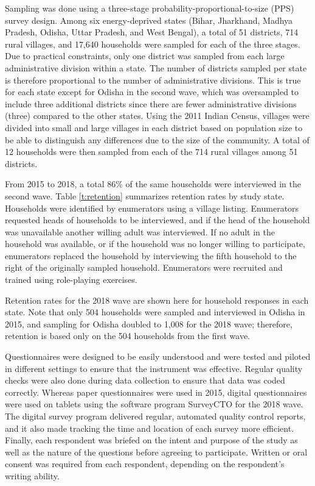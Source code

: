 \documentclass[11pt]{article}
\begin{document}
Sampling was done using a three-stage probability-proportional-to-size (PPS) survey design. Among six energy-deprived states (Bihar, Jharkhand, Madhya Pradesh, Odisha, Uttar Pradesh, and West Bengal), a total of 51 districts, 714 rural villages, and 17,640 households were sampled for each of the three stages. Due to practical constraints, only one district was sampled from each large administrative division within a state. The number of districts sampled per state is therefore proportional to the number of administrative divisions. This is true for each state except for Odisha in the second wave, which was oversampled to include three additional districts since there are fewer administrative divisions (three) compared to the other states. Using the 2011 Indian Census, villages were divided into small and large villages in each district based on population size to be able to distinguish any differences due to the size of the community. A total of 12 households were then sampled from each of the 714 rural villages among 51 districts. 

From 2015 to 2018, a total 86\% of the same households were interviewed in the second wave. Table \ref{t:retention} summarizes retention rates by study state. Households were identified by enumerators using a village listing. Enumerators requested heads of households to be interviewed, and if the head of the household was unavailable another willing adult was interviewed. If no adult in the household was available, or if the household was no longer willing to participate, enumerators replaced the household by interviewing the fifth household to the right of the originally sampled household. Enumerators were recruited and trained using role-playing exercises. 

\begin{table}
\centering
\renewcommand{\arraystretch}{1.8}

\caption{Retention rates for the 2018 wave are shown here for household responses in each state. Note that only 504 households were sampled and interviewed in Odisha in 2015, and sampling for Odisha doubled to 1,008 for the 2018 wave; therefore, retention is based only on the 504 households from the first wave.}
\label{t:retention}
\end{table}

Questionnaires were designed to be easily understood and were tested and piloted in different settings to ensure that the instrument was effective. Regular quality checks were also done during data collection to ensure that data was coded correctly. Whereas paper questionnaires were used in 2015, digital questionnaires were used on tablets using the software program SurveyCTO for the 2018 wave. The digital survey program delivered regular, automated quality control reports, and it also made tracking the time and location of each survey more efficient. Finally, each respondent was briefed on the intent and purpose of the study as well as the nature of the questions before agreeing to participate. Written or oral consent was required from each respondent, depending on the respondent's writing ability. 
\end{document}
